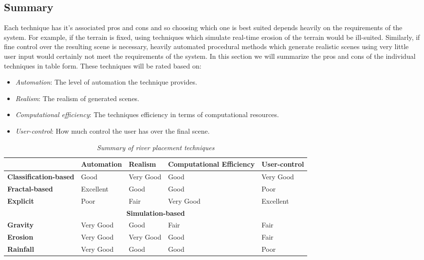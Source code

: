 \subsection{Summary} \label{Summary}

Each technique has it's associated pros and cons and so choosing which one is best suited depends heavily on the requirements of the system. For example, if the terrain is fixed, using techniques which simulate real-time erosion of the terrain would be ill-suited. Similarly, if fine control over the resulting scene is necessary, heavily automated procedural methods which generate realistic scenes using very little user input would certainly not meet the requirements of the system. In this section we will summarize the pros and cons of the individual techniques in table form. These techniques will be rated based on:
\begin{itemize}
\item \textit{Automation}: The level of automation the technique provides.
\item \textit{Realism}: The realism of generated scenes.
\item \textit{Computational efficiency}: The techniques efficiency in terms of computational resources.
\item \textit{User-control}: How much control the user has over the final scene. 
\end{itemize}

\begin{table}[h]
  \centering
	    \begin{tabular}{|p{4cm}|p{3cm}|p{3cm}|p{3cm}|p{3cm}|}
  	    \hline	
  	      & \textbf{Automation} & \textbf{Realism} & \textbf{Computational Efficiency} & \textbf{User-control} \\
		\hline	
		\textbf{Classification-based} & 
		 Good  & Very Good  & Good & Very Good  \\
  	    \hline	
		\textbf{Fractal-based} & 
		 Excellent & Good & Good & Poor  \\
  	    \hline
		\textbf{Explicit} & 
		 Poor & Fair & Very Good & Excellent   \\
  	    \hline
  	    \multicolumn{5}{|c|}{\textbf{Simulation-based}} \\
  	    \hline				
  	    \textbf{Gravity} & 
		 Very Good & Good & Fair & Fair   \\
  	    \hline
		\textbf{Erosion} & 
		 Very Good & Very Good & Good & Fair      \\
  	    \hline
  	    	\textbf{Rainfall} & 
		 Very Good & Good & Good & Poor      \\
  	    \hline		
  	    \end{tabular}
  \caption{\textit{Summary of river placement techniques}}
	\label{Pros and cons of individual techniques}
\end{table}

